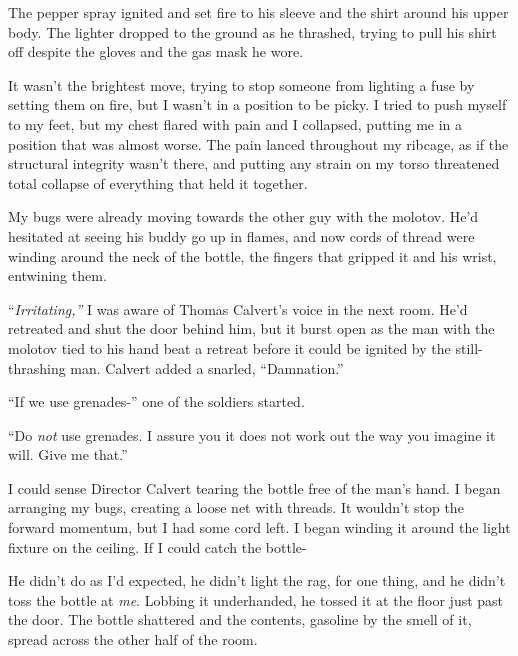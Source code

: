 The pepper spray ignited and set fire to his sleeve and the shirt around his upper body.  The lighter dropped to the ground as he thrashed, trying to pull his shirt off despite the gloves and the gas mask he wore.



It wasn't the brightest move, trying to stop someone from lighting a fuse by setting them on fire, but I wasn't in a position to be picky.  I tried to push myself to my feet, but my chest flared with pain and I collapsed, putting me in a position that was almost worse.  The pain lanced throughout my ribcage, as if the structural integrity wasn't there, and putting any strain on my torso threatened total collapse of everything that held it together.



My bugs were already moving towards the other guy with the molotov.  He'd hesitated at seeing his buddy go up in flames, and now cords of thread were winding around the neck of the bottle, the fingers that gripped it and his wrist, entwining them.



``\emph{Irritating,'' }I was aware of Thomas Calvert's voice in the next room.  He'd retreated and shut the door behind him, but it burst open as the man with the molotov tied to his hand beat a retreat before it could be ignited by the still-thrashing man.  Calvert added a snarled, ``Damnation.''



``If we use grenades-'' one of the soldiers started.



``Do \emph{not} use grenades.  I assure you it does not work out the way you imagine it will.  Give me that.''



I could sense Director Calvert tearing the bottle free of the man's hand.  I began arranging my bugs, creating a loose net with threads.  It wouldn't stop the forward momentum, but I had some cord left.  I began winding it around the light fixture on the ceiling.  If I could catch the bottle-



He didn't do as I'd expected, he didn't light the rag, for one thing, and he didn't toss the bottle at \emph{me}.  Lobbing it underhanded, he tossed it at the floor just past the door.  The bottle shattered and the contents, gasoline by the smell of it, spread across the other half of the room.



